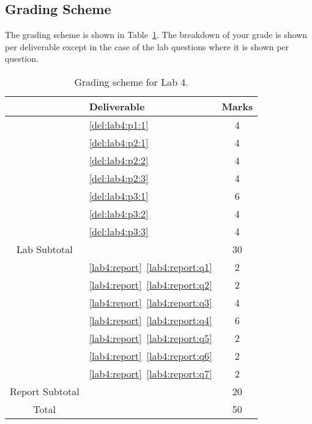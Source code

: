 \subsection{Grading Scheme}
The grading scheme is shown in Table~\ref{tab:lab4:grading}. The breakdown of
your grade is shown per deliverable except in the case of the lab
questions where it is shown per question.
%
\begin{table}
\centering
\begin{tabular}{c|l|c}
        & Deliverable           & Marks  \\ \hline
        & \ref{del:lab4:p1:1}         & 4       \\ \hline
        & \ref{del:lab4:p2:1}         & 4       \\ \hline
        & \ref{del:lab4:p2:2}         & 4      \\ \hline
        & \ref{del:lab4:p2:3}         & 4      \\ \hline
        & \ref{del:lab4:p3:1}         & 6       \\ \hline
        & \ref{del:lab4:p3:2}         & 4       \\ \hline
        & \ref{del:lab4:p3:3}         & 4       \\ \hhline{=|=|=}
Lab Subtotal&                       & 30      \\ \hhline{=|=|=}
        & \ref{lab4:report}~\ref{lab4:report:q1}  & 2       \\ \hline
        & \ref{lab4:report}~\ref{lab4:report:q2}  & 2       \\ \hline
        & \ref{lab4:report}~\ref{lab4:report:q3}  & 4       \\ \hline
        & \ref{lab4:report}~\ref{lab4:report:q4}  & 6       \\ \hline
        & \ref{lab4:report}~\ref{lab4:report:q5}  & 2      \\ \hline
        & \ref{lab4:report}~\ref{lab4:report:q6}  & 2      \\ \hline
        & \ref{lab4:report}~\ref{lab4:report:q7}  & 2      \\ \hhline{=|=|=}
Report Subtotal&  & 20 \\ \hhline{=|=|=}
  Total &                       & 50
\end{tabular}
\caption[Grading Scheme for Lab 4]{Grading scheme for Lab 4.}
\label{tab:lab4:grading}
\end{table}
%
